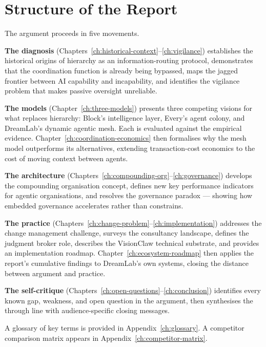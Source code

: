 \section{Structure of the Report}

The argument proceeds in five movements.

\textbf{The diagnosis} (Chapters~\ref{ch:historical-context}--\ref{ch:vigilance}) establishes the historical origins of hierarchy as an information-routing protocol, demonstrates that the coordination function is already being bypassed, maps the jagged frontier between AI capability and incapability, and identifies the vigilance problem that makes passive oversight unreliable.

\textbf{The models} (Chapter~\ref{ch:three-models}) presents three competing visions for what replaces hierarchy: Block's intelligence layer, Every's agent colony, and DreamLab's dynamic agentic mesh. Each is evaluated against the empirical evidence. Chapter~\ref{ch:coordination-economics} then formalises why the mesh model outperforms its alternatives, extending transaction-cost economics to the cost of moving context between agents.

\textbf{The architecture} (Chapters~\ref{ch:compounding-org}--\ref{ch:governance}) develops the compounding organisation concept, defines new key performance indicators for agentic organisations, and resolves the governance paradox --- showing how embedded governance accelerates rather than constrains.

\textbf{The practice} (Chapters~\ref{ch:change-problem}--\ref{ch:implementation}) addresses the change management challenge, surveys the consultancy landscape, defines the judgment broker role, describes the VisionClaw technical substrate, and provides an implementation roadmap. Chapter~\ref{ch:ecosystem-roadmap} then applies the report's cumulative findings to DreamLab's own systems, closing the distance between argument and practice.

\textbf{The self-critique} (Chapters~\ref{ch:open-questions}--\ref{ch:conclusion}) identifies every known gap, weakness, and open question in the argument, then synthesises the through line with audience-specific closing messages.

A glossary of key terms is provided in Appendix~\ref{ch:glossary}. A competitor comparison matrix appears in Appendix~\ref{ch:competitor-matrix}.
